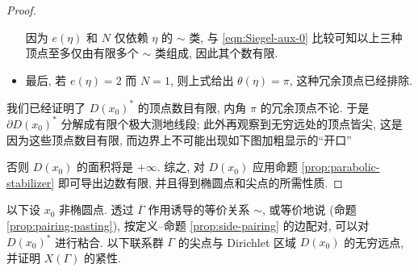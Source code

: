 \begin{proof}
\begin{itemize}
		因为 $e(\eta)$ 和 $N$ 仅依赖 $\eta$ 的 $\sim$ 类, 与 \eqref{eqn:Siegel-aux-0} 比较可知以上三种顶点至多仅由有限多个 $\sim$ 类组成, 因此其个数有限.
		\item 最后, 若 $e(\eta) = 2$ 而 $N = 1$, 则上式给出 $\theta(\eta) = \pi$, 这种冗余顶点已经排除.
	\end{itemize}
	我们已经证明了 $D(x_0)^*$ 的顶点数目有限, 内角 $\pi$ 的冗余顶点不论. 于是 $\partial D(x_0)^*$ 分解成有限个极大测地线段; 此外再观察到无穷远处的顶点皆尖, 这是因为这些顶点数目有限, 而边界上不可能出现如下图加粗显示的``开口''
	\begin{center}\end{center}
	否则 $D(x_0)$ 的面积将是 $+\infty$. 综之, 对 $D(x_0)$ 应用命题 \ref{prop:parabolic-stabilizer} 即可导出边数有限, 并且得到椭圆点和尖点的所需性质.
\end{proof}

以下设 $x_0$ 非椭圆点. 透过 $\overline{\Gamma}$ 作用诱导的等价关系 $\sim$, 或等价地说 (命题 \ref{prop:pairing-pasting}), 按定义--命题 \ref{prop:side-pairing} 的边配对, 可以对 $D(x_0)^*$ 进行粘合. 以下联系群 $\Gamma$ 的尖点与 Dirichlet 区域 $D(x_0)$ 的无穷远点, 并证明 $X(\Gamma)$ 的紧性.

